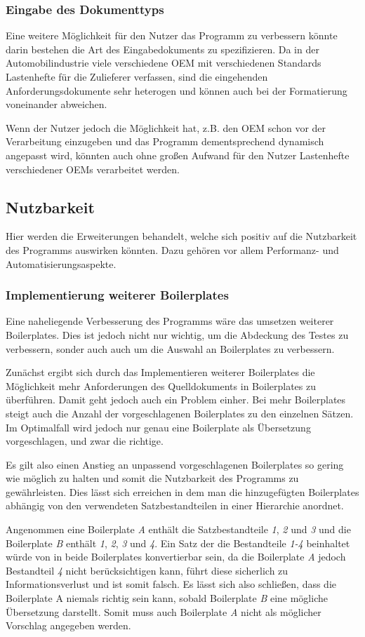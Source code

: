 \documentclass[12pt]{report}
\begin{document}
\subsubsection{Eingabe des Dokumenttyps}
Eine weitere Möglichkeit für den Nutzer das Programm zu verbessern könnte darin bestehen die Art des Eingabedokuments zu spezifizieren. Da in der Automobilindustrie viele verschiedene OEM mit verschiedenen Standards Lastenhefte für die Zulieferer verfassen, sind die eingehenden Anforderungsdokumente sehr heterogen und können auch bei der Formatierung voneinander abweichen. 

Wenn der Nutzer jedoch die Möglichkeit hat, z.B. den OEM schon vor der Verarbeitung einzugeben und das Programm dementsprechend dynamisch angepasst wird, könnten auch ohne großen Aufwand für den Nutzer Lastenhefte verschiedener OEMs verarbeitet werden. 

\subsection{Nutzbarkeit}
Hier werden die Erweiterungen behandelt, welche sich positiv auf die Nutzbarkeit des Programms auswirken könnten. Dazu gehören vor allem Performanz- und Automatisierungsaspekte.
\subsubsection{Implementierung weiterer Boilerplates}
Eine naheliegende Verbesserung des Programms wäre das umsetzen weiterer Boilerplates. Dies ist jedoch nicht nur wichtig, um die Abdeckung des Testes zu verbessern, sonder auch auch um die Auswahl an Boilerplates zu verbessern. 

Zunächst ergibt sich durch das Implementieren weiterer Boilerplates die Möglichkeit mehr Anforderungen des Quelldokuments in Boilerplates zu überführen. Damit geht jedoch auch ein Problem einher. Bei mehr Boilerplates steigt auch die Anzahl der vorgeschlagenen Boilerplates zu den einzelnen Sätzen. Im Optimalfall wird jedoch nur genau eine Boilerplate als Übersetzung vorgeschlagen, und zwar die richtige. 

Es gilt also einen Anstieg an unpassend vorgeschlagenen Boilerplates so gering wie möglich zu halten und somit die Nutzbarkeit des Programms zu gewährleisten. Dies lässt sich erreichen in dem man die hinzugefügten Boilerplates abhängig von den verwendeten Satzbestandteilen in einer Hierarchie anordnet. 

Angenommen eine Boilerplate \textit{A} enthält die Satzbestandteile \textit{1}, \textit{2} und \textit{3} und die Boilerplate \textit{B} enthält \textit{1}, \textit{2}, \textit{3} und \textit{4}. Ein Satz der die Bestandteile \textit{1-4} beinhaltet würde von in beide Boilerplates konvertierbar sein, da die Boilerplate \textit{A} jedoch Bestandteil \textit{4} nicht berücksichtigen kann, führt diese sicherlich zu Informationsverlust und ist somit falsch. Es lässt sich also schließen, dass die Boilerplate A niemals richtig sein kann, sobald Boilerplate \textit{B} eine  mögliche Übersetzung darstellt. Somit muss auch Boilerplate \textit{A} nicht als möglicher Vorschlag angegeben werden. 
\end{document}
